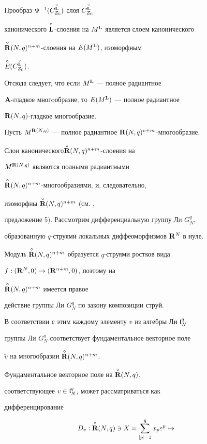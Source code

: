 \begin{pf}
Прообраз $\Psi^{-1}(C^{\overset{\circ}{\bold L}{}}_{Z_0})$ слоя $C^{\overset{\circ}{\bold L}{}}_{Z_0}$


канонического $\overset{\circ}{\bold L}{}$-слоения на $M^{\bold L}$ является слоем канонического


$\overset{\circ}{{\bold R}}{}(N,q)^{n+m}$-слоения на $E(M^{\bold L})$, изоморфным


$\overset{\circ}{E}{}(C^{\overset{\circ}{\bold L}{}}_{Z_0})$.


Отсюда следует, что если $M^{\bold L}$ --- полное радиантное


${\bold A}$-гладкое многoобразие, то $E(M^{\bold L})$ --- полное радиантное


${\bold R}(N,q)$-гладкое многообразие.





Пусть $M^{{\bold R}(N,q)}$ --- полное радиантное ${\bold R}(N,q)^{n+m}$-многообразие.


Слои канонического\linebreak $\overset{\circ}{{\bold R}}{}(N,q)^{n+m}$-слоения на


$M^{{\bold R}(N,q)}$ являются полными радиантными


$\overset{\circ}{{\bold R}}{}(N,q)^{n+m}$-многообразиями, и, следовательно,


изоморфны $\overset{\circ}{{\bold R}}{}(N,q)^{n+m}$ (см. \cite{VSh17},


предложение 5). Рассмотрим дифференциальную группу Ли $G^q_N$,


образованную $q$-струями локальных диффеоморфизмов ${\bold R}^N$ в нуле.


Модуль $\overset{\circ}{{\bold R}}{}(N,q)^{n+m}$ образуется $q$-струями ростков вида


$f:({\bold R}^N,0)\to({\bold R}^{n+m},0)$, поэтому на


$\overset{\circ}{{\bold R}}{}(N,q)^{n+m}$ имеется правое


действие группы Ли $G^q_N$ по закону композиции струй.


В соответствии с этим каждому элементу $v$ из алгебры Ли ${\frak l}^q_N$


группы Ли $G^q_N$ соответствует фундаментальное векторное поле


$\widetilde v$ на многообразии $\overset{\circ}{{\bold R}}{}(N,q)^{n+m}$.


Фундаментальное векторное поле на $\overset{\circ}{{\bold R}}{}(N,q)$,


соответствующее $v\in{\frak l}^q_N$, может рассматриваться как


дифференцирование


\begin{equation}


D_v:\puto{\R}(N,q)\ni X=\sum^q_{|p|=1}x_p\varepsilon^p\mapsto



\end{equation}
\end{pf}
